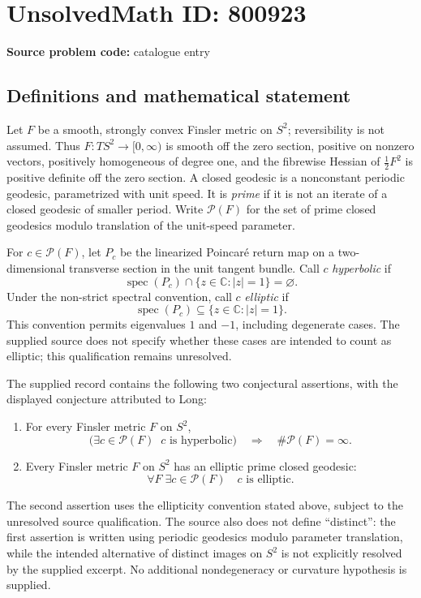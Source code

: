 \documentclass[11pt]{article}
\newcommand{\C}{\mathbb{C}}
\begin{document}
\section*{UnsolvedMath ID: 800923}
\textbf{Source problem code:} catalogue entry
\subsection{Definitions and mathematical statement}
Let \(F\) be a smooth, strongly convex Finsler metric on \(S^2\); reversibility is not assumed. Thus \(F:TS^2\to[0,\infty)\) is smooth off the zero section, positive on nonzero vectors, positively homogeneous of degree one, and the fibrewise Hessian of \(\tfrac12F^2\) is positive definite off the zero section. A closed geodesic is a nonconstant periodic geodesic, parametrized with unit speed. It is \emph{prime} if it is not an iterate of a closed geodesic of smaller period. Write \(\mathcal P(F)\) for the set of prime closed geodesics modulo translation of the unit-speed parameter.

For \(c\in\mathcal P(F)\), let \(P_c\) be the linearized Poincar\'e return map on a two-dimensional transverse section in the unit tangent bundle. Call \(c\) \emph{hyperbolic} if
\[
\operatorname{spec}(P_c)\cap\{z\in\C:|z|=1\}=\varnothing.
\]
Under the non-strict spectral convention, call \(c\) \emph{elliptic} if
\[
\operatorname{spec}(P_c)\subseteq\{z\in\C:|z|=1\}.
\]
This convention permits eigenvalues \(1\) and \(-1\), including degenerate cases. The supplied source does not specify whether these cases are intended to count as elliptic; this qualification remains unresolved.

The supplied record contains the following two conjectural assertions, with the displayed conjecture attributed to Long:
\begin{enumerate}
\item For every Finsler metric \(F\) on \(S^2\),
\[
\bigl(\exists c\in\mathcal P(F)\;\;c\text{ is hyperbolic}\bigr)
\quad\Longrightarrow\quad
\#\mathcal P(F)=\infty.
\]
\item Every Finsler metric \(F\) on \(S^2\) has an elliptic prime closed geodesic:
\[
\forall F\;\exists c\in\mathcal P(F)\quad c\text{ is elliptic}.
\]
\end{enumerate}
The second assertion uses the ellipticity convention stated above, subject to the unresolved source qualification. The source also does not define ``distinct'': the first assertion is written using periodic geodesics modulo parameter translation, while the intended alternative of distinct images on \(S^2\) is not explicitly resolved by the supplied excerpt. No additional nondegeneracy or curvature hypothesis is supplied.
\end{document}
